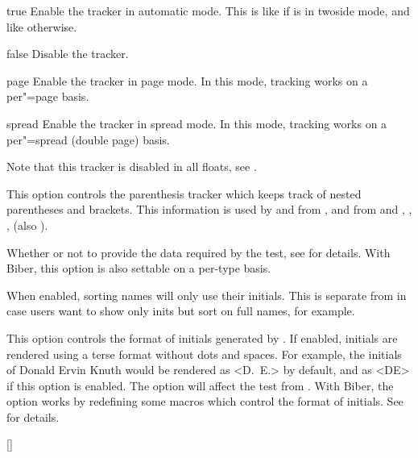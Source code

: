\documentclass{ltxdockit}[2011/03/25]
\newcommand*{\biber}{Biber\xspace}
\begin{document}
\begin{optionlist}
\begin{valuelist}
\item[true] Enable the tracker in automatic mode. This is like  if \latex is in twoside mode, and like  otherwise.
\item[false] Disable the tracker.
\item[page] Enable the tracker in page mode. In this mode, tracking works on a per"=page basis.
\item[spread] Enable the tracker in spread mode. In this mode, tracking works on a per"=spread (double page) basis.
\end{valuelist}

Note that this tracker is disabled in all floats, see .


This option controls the parenthesis tracker which keeps track of nested parentheses and brackets. This information is used by  and  from ,  and  from  and , , ,  (also ).


Whether or not to provide the data required by the  test, see  for details.
\BiberOnlyMark With \biber, this option is also settable on a per-type basis.


When enabled, sorting names will only use their initials. \BiberOnlyMark This is separate from  in case users want to show only inits but sort on full names, for example.


This option controls the format of initials generated by . If enabled, initials are rendered using a terse format without dots and spaces. For example, the initials of Donald Ervin Knuth would be rendered as <D.~E.> by default, and as <DE> if this option is enabled. The option will affect the  test from . \BiberOnlyMark With \biber, the option works by redefining some macros which control the format of initials. See  for details.

[\BiberOnly]


\end{optionlist}
\end{document}
